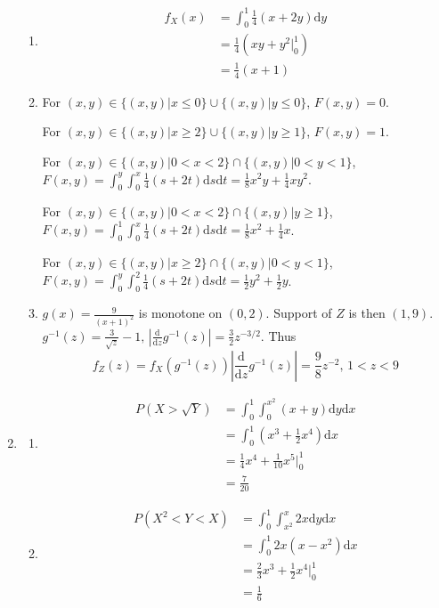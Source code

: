 \documentclass{article}
\begin{document}
\begin{enumerate}[leftmargin = 0 em, label = \arabic*., font = \bfseries]
\begin{enumerate}
		\item 
		\begin{align*}
		f_X(x) &= \int_0^1 \frac{1}{4}(x+ 2 y ) \mathrm{d}y\\
		& =  \frac{1}{4}\left( x y + y^2 \big|_0^1\right)\\
		& = \frac{1}{4}(x+1)
		\end{align*}

		\item 
		For $(x,y)\in \{(x,y)| x \leq 0\} \cup \{(x,y)| y\leq 0\}$, $F(x,y) = 0$.

		For $(x,y) \in \{(x,y)| x \geq 2\} \cup \{(x,y)| y \geq 1\}$, $F(x,y) = 1$.

		For $(x,y) \in \{(x,y)| 0< x < 2\} \cap \{(x,y)| 0 < y < 1\}$, $F(x,y) = \int_0^y \int_0^x \frac{1}{4}(s + 2t) \mathrm{d}s \mathrm{d}t = \frac{1}{8} x^2 y + \frac{1}{4}xy^2$.

		For $(x,y) \in \{(x,y)| 0 < x < 2\} \cap \{(x,y)| y \geq 1\}$, $F(x,y) = \int_{0}^1 \int_0^x \frac{1}{4}(s+ 2t)\mathrm{d}s \mathrm{d}t = \frac{1}{8}x^2 + \frac{1}{4}x $.

		For $(x,y) \in \{(x,y)| x \geq 2\} \cap \{(x,y)| 0 < y < 1\}$, $F(x,y) = \int_{0}^y \int_0^2 \frac{1}{4}(s+ 2t)\mathrm{d}s \mathrm{d}t = \frac{1}{2}y^2 + \frac{1}{2} y$.

		\item  $g(x) = \frac{9}{(x+1)^2}$ is monotone on $(0, 2)$. Support of $Z$ is then $(1, 9)$.  $g^{-1}(z) = \frac{3}{\sqrt{z}} - 1,\, \left|\frac{\mathrm{d}}{\mathrm{d}z}g^{-1}(z)\right| = \frac{3}{2} z^{-3/2}.$ Thus 
		\[f_Z (z) = f_X(g^{-1}(z)) \left|\frac{\mathrm{d}}{\mathrm{d}z}g^{-1}(z)\right| = \frac{9}{8}z^{-2}, \, 1< z < 9\]

		
	\end{enumerate}
	

	\item 
	\begin{enumerate}
		\item \begin{align*}
		P(X > \sqrt{Y}) & = \int_{0}^1 \int_{0}^{x^2} (x+y)\mathrm{d}y \mathrm{d}x\\
		& = \int_0^1 (x^3 + \frac{1}{2} x^4) \mathrm{d}x\\
		& = \frac{1}{4}x^4 + \frac{1}{10} x^5 \bigg|_0^1 \\
		& = \frac{7}{20}
		\end{align*}
		
		\item \begin{align*}
		P(X^2 < {Y} < X) & = \int_{0}^1 \int_{x^2}^{x} 2x \mathrm{d}y \mathrm{d}x\\
		& = \int_0^1 2x(x - x^2) \mathrm{d}x\\
		& = \frac{2}{3}x^3 + \frac{1}{2} x^4 \bigg|_0^1 \\
		& = \frac{1}{6}
		\end{align*}
	\end{enumerate}



\end{enumerate}
\end{document}
